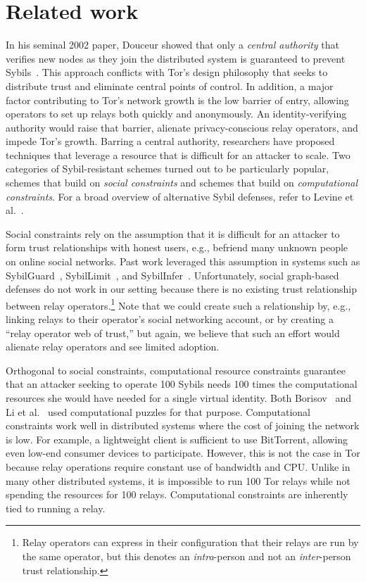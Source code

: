 \section{Related work}
\label{sec:related_work}
In his seminal 2002 paper, Douceur showed that only a \emph{central authority}
that verifies new nodes as they join the distributed system is guaranteed to
prevent Sybils~\cite{Douceur2002a}.  This approach conflicts with Tor's design
philosophy that seeks to distribute trust and eliminate central points of
control.  In addition, a major factor contributing to Tor's network growth is
the low barrier of entry, allowing operators to set up relays both quickly and
anonymously.  An identity-verifying authority would raise that barrier,
alienate privacy-conscious relay operators, and impede Tor's growth.  Barring a
central authority, researchers have proposed techniques that leverage a
resource that is difficult for an attacker to scale.  Two categories of
Sybil-resistant schemes turned out to be particularly popular, schemes that
build on \emph{social constraints} and schemes that build on
\emph{computational constraints}.  For a broad overview of alternative Sybil
defenses, refer to Levine et al.~\cite{Levine2006a}.

Social constraints rely on the assumption that it is difficult for an attacker
to form trust relationships with honest users, e.g., befriend many unknown
people on online social networks.  Past work leveraged this assumption in
systems such as SybilGuard~\cite{Yu2006a}, SybilLimit~\cite{Yu2008a}, and
SybilInfer~\cite{Danezis2009a}.  Unfortunately, social graph-based defenses do
not work in our setting because there is no existing trust relationship between
relay operators.\footnote{Relay operators can express in their configuration
that their relays are run by the same operator, but this denotes an
\emph{intra}-person and not an \emph{inter}-person trust relationship.}  Note
that we could create such a relationship by, e.g., linking relays to their
operator's social networking account, or by creating a ``relay operator web of
trust,'' but again, we believe that such an effort would alienate relay
operators and see limited adoption.

Orthogonal to social constraints, computational resource constraints guarantee
that an attacker seeking to operate 100 Sybils needs 100 times the
computational resources she would have needed for a single virtual identity.
Both Borisov~\cite{Borisov2006a} and Li et al.~\cite{Li2012a} used
computational puzzles for that purpose.  Computational constraints work well in
distributed systems where the cost of joining the network is low.  For example,
a lightweight client is sufficient to use BitTorrent, allowing even low-end
consumer devices to participate.  However, this is not the case in Tor because
relay operations require constant use of bandwidth and CPU.  Unlike in many
other distributed systems, it is impossible to run 100 Tor relays while not
spending the resources for 100 relays.  Computational constraints are
inherently tied to running a relay.

